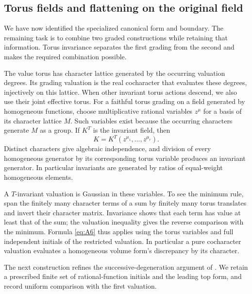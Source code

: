 \subsection{Torus fields and flattening on the original field}

We have now identified the specialized canonical form and boundary.
The remaining task is to combine two graded constructions while retaining
that information. Torus invariance separates the first grading from the
second and makes the required combination possible.

The value torus has character lattice generated by the occurring
valuation degrees. Its grading valuation is the real cocharacter that
evaluates these degrees, injectively on this lattice. When other
invariant torus actions descend, we also use their joint effective torus.
For a faithful torus grading on a field generated by homogeneous
functions, choose multiplicative rational variables \(z^\mu\) for a
basis of its character lattice \(M\). Such variables exist because the
occurring characters generate \(M\) as a group. If \(K^T\) is the
invariant field, then
\[
                  K=K^T(z^{\mu_1},\ldots,z^{\mu_r}).
\]
Distinct characters give algebraic independence, and division of every
homogeneous generator by its corresponding torus variable produces an
invariant generator. In particular invariants are generated by ratios
of equal-weight homogeneous elements.

A \(T\)-invariant valuation is Gaussian in these variables. To see the
minimum rule, span the finitely many character terms of a sum by finitely
many torus translates and invert their character matrix. Invariance
shows that each term has value at least that of the sum; the valuation
inequality gives the reverse comparison with the minimum. Formula
\eqref{eq:A6} thus applies using the torus variables and full independent
initials of the restricted valuation. In particular a pure cocharacter
valuation evaluates a homogeneous volume form's discrepancy by its
character.

The next construction refines the successive-degeneration argument of
\cite[proof of Theorem~4.16 and Remark~4.17]{LiXuStable}.
We retain a prescribed finite set of rational-function initials and the
leading top form, and record uniform comparison with the first valuation.

